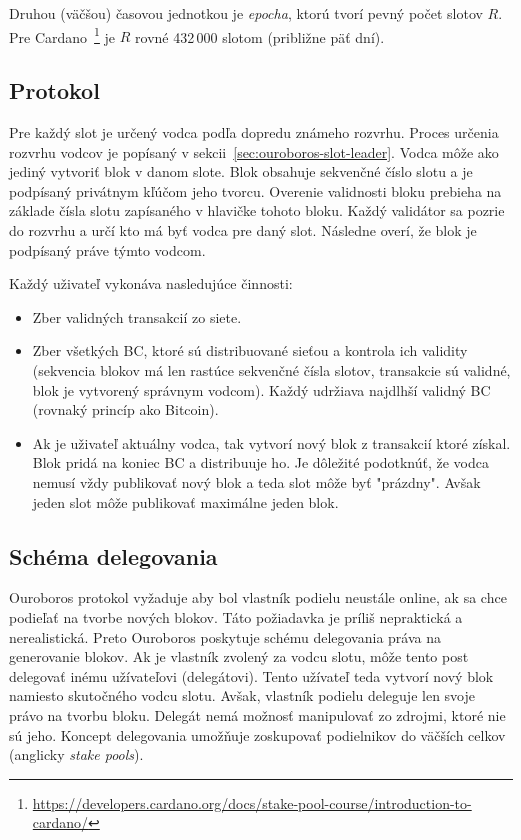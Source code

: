 Druhou (väčšou) časovou jednotkou je \textit{epocha}, ktorú tvorí pevný počet slotov $R$. Pre Cardano~\footnote{\url{https://developers.cardano.org/docs/stake-pool-course/introduction-to-cardano/}} je $R$ rovné 432\,000 slotom (približne päť dní).

\subsection{Protokol}\label{subsec:ouroboros-protocol}
Pre každý slot je určený vodca podľa dopredu známeho rozvrhu. Proces určenia rozvrhu vodcov je popísaný v sekcii~\ref{sec:ouroboros-slot-leader}. Vodca môže ako jediný vytvoriť blok v danom slote. 
Blok obsahuje sekvenčné číslo slotu a je podpísaný privátnym kľúčom jeho tvorcu. Overenie validnosti bloku prebieha na základe čísla slotu zapísaného v hlavičke tohoto bloku. Každý validátor sa pozrie do rozvrhu a určí kto má byť vodca pre daný slot. Následne overí, že blok je podpísaný práve týmto vodcom.

Každý uživateľ vykonáva nasledujúce činnosti:
\begin{itemize}
	\item Zber validných transakcií zo siete.
	\item Zber všetkých BC, ktoré sú distribuované sieťou a kontrola ich validity (sekvencia blokov má len rastúce sekvenčné čísla slotov, transakcie sú validné, blok je vytvorený správnym vodcom). Každý udržiava najdlhší validný BC (rovnaký princíp ako Bitcoin).
	\item Ak je uživateľ aktuálny vodca, tak vytvorí nový blok z transakcií ktoré získal. Blok pridá na koniec BC a distribuuje ho. Je dôležité podotknúť, že vodca nemusí vždy publikovať nový blok a teda slot môže byť "prázdny". Avšak jeden slot môže publikovať maximálne jeden blok.
\end{itemize}

\subsection{Schéma delegovania}\label{subsec:ourobors-delegation}
Ouroboros protokol vyžaduje aby bol vlastník podielu neustále online, ak sa chce podieľať na tvorbe nových blokov. Táto požiadavka je príliš nepraktická a nerealistická. Preto Ouroboros poskytuje schému delegovania práva na generovanie blokov. Ak je vlastník zvolený za vodcu slotu, môže tento post delegovať inému užívateľovi (delegátovi). Tento užívateľ teda vytvorí nový blok namiesto skutočného vodcu slotu. Avšak, vlastník podielu deleguje len svoje právo na tvorbu bloku. Delegát nemá možnosť manipulovať zo zdrojmi, ktoré nie sú jeho. Koncept delegovania umožňuje zoskupovať podielnikov do väčších celkov (anglicky \textit{stake pools}). 

